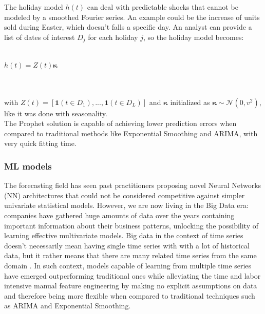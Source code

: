 \documentclass[a4paper, 12pt]{article} %
\begin{document}
	The holiday model $h(t)$ can deal with predictable shocks that cannot be modeled by a smoothed Fourier series.  An example could be the increase of units sold during Easter, which doesn't falls a specific day. An analyst can provide a list of dates of interest $D_j$ for each holiday $j$, so the holiday model becomes:\\\\
	\centerline{$h(t) = Z(t) \pmb{\kappa}$}\\\\
	with $Z(t) = [ \mathbf{1} (t \in D_1), ..., \mathbf{1} (t \in D_L)] $ and $\pmb{\kappa}$ initialized as $\pmb{\kappa} \sim \mathcal{N}(0, v^2)$, like it was done with seasonality.\\
	The Prophet solution is capable of achieving lower prediction errors when compared to traditional methods like Exponential Smoothing and ARIMA, with very quick fitting time.
	
	\subsubsection{ML models}
	The forecasting field has seen past practitioners proposing novel Neural Networks (NN) architectures that could not be considered competitive against simpler univariate statistical models. However, we are now living in the Big Data era: companies have gathered huge amounts of data over the years containing important information about their business patterns, unlocking the possibility of learning effective multivariate models. Big data in the context of time series doesn't necessarily mean having single time series with with a lot of historical data, but it rather means that there are many related time series from the same domain \cite{RNNForecasting}. In such context, models capable of learning from multiple time series have emerged \cite{M5Competition} outperforming traditional ones while alleviating the time and labor intensive manual feature engineering by making no explicit assumptions on data and therefore being more flexible when compared to traditional techniques such as ARIMA and Exponential Smoothing.
	
\end{document}
